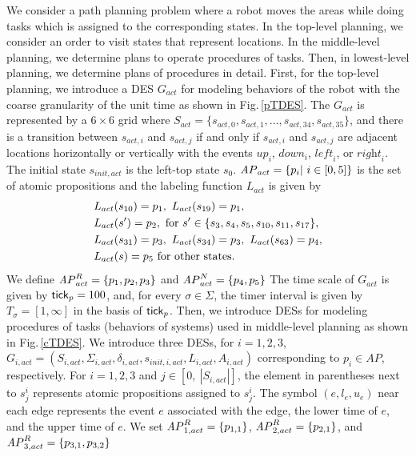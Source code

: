 \documentclass[journal,twoside,web]{IEEEtran}
\newcommand{\rfig}[1]{Fig.\,\ref{#1}}
\newcommand{\tick}{{\sf tick}}
\newcommand{\AP}{{\textit AP}}
\begin{document}
We consider a path planning problem where a robot moves the areas while doing tasks which is assigned to the corresponding states.
In the top-level planning, we consider an order to visit states that represent locations.
In the middle-level planning, we determine plans to operate procedures of tasks. 
Then, in lowest-level planning, we determine plans of procedures in detail.
%
%
First, for the top-level planning, we introduce a DES $G_{act}$ for modeling behaviors of the robot 
 with the coarse granularity of the unit time as shown in \rfig{pTDES}.
%
The $G_{act}$ is represented by a $6\times6$ grid where $S_{act}=\{s_{act,0},s_{act,1},\ldots,s_{act,{34}},s_{act,{35}}\}$, and there is a transition between $s_{act,i}$ and $s_{act,j}$ if and only if $s_{act,i}$ and $s_{act,j}$ are adjacent locations horizontally or vertically with the events $\textit{up}_i$, $\textit{down}_i$, $\textit{left}_i$, or $\textit{right}_i$.
%
The initial state $s_{init,act}$ is the left-top state $s_0$.
$\AP_{act}=\{p_i|~i\in[0,5]\}$ is the set of atomic propositions and the labeling function $L_{act}$ is given by
\begin{align}
&L_{act}(s_{ 10 }) =  p_1,\
L_{act}(s_{19}) =  p_1, \notag \\
&L_{act}(s') = p_2,\mbox{ for } s'\in\{s_3,s_4,s_5,s_{10},s_{11},s_{17}\}, \notag\\
&L_{act}(s_{ 31 }) = p_3,\ 
L_{act}(s_{ 34 }) =  p_3, \ 
L_{act}(s_{ 63 }) =  p_4,\notag\\
&L_{act}(s) =  p_5\mbox{ for other states.}%
\end{align}
We define $\AP_{act}^R=\{p_1,p_2,p_3\}$ and $\AP_{act}^N=\{p_4,p_5\}$ 
The time scale of $G_{act}$ is given by ${\tick}_p=100$, and, for every $\sigma\in \Sigma$, the timer interval is given by $T_\sigma=[1,\infty]$ in the basis of ${\tick}_p$.
%
%
Then, we introduce DESs for modeling procedures of tasks (behaviors of systems) used in middle-level planning as shown in \rfig{cTDES}.
We introduce three DESs, for $i=1,2,3$, $G_{i,act}=(S_{i,act}, \Sigma_{i,act}, \delta_{i,act},s_{init,i,act}, L_{i,act}, A_{i,act})$ corresponding to $p_i\in \textit{AP}$, respectively.
For $i=1,2,3$ and $j\in[0,\ |S_{i,act}|]$, the element in parentheses next to $s_j^i$ represents atomic propositions assigned to $s_j^i$.
%
The symbol $(e,l_e,u_e)$ near each edge represents the event  $e$ associated with the edge, the lower time of $e$, and the upper time of $e$.
We set $\AP_{1,act}^R=\{p_{1,1}\}$, $\AP_{2,act}^R=\{p_{2,1}\}$, and $\AP_{3,act}^R=\{p_{3,1},p_{3,2}\}$
%
\end{document}
